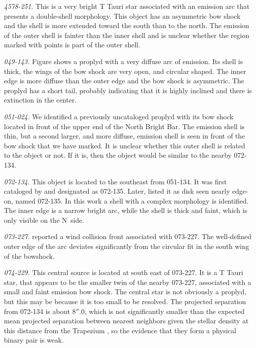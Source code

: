 \documentclass[apj, twocolumn]{aastex63}
\begin{document}
\textit{4578-251.} This is a very bright T Tauri star
associated with an emission arc that presents a double-shell
morphology. This object has an asymmetric bow shock and
the shell is more extended toward the south than to the north.
The emission of the outer shell is fainter than the inner
shell and is unclear whether the region marked with points
is part of the outer shell.

\textit{049-143.} Figure shows a proplyd \citep{Ricci:2008a}
with a very diffuse arc of emission. Its shell is thick,
the wings of the bow shock are very open, and circular
shaped. The inner edge is more diffuse than the outer edge
and the bow shock is asymmetric. The  proplyd has a short
tail, probably indicating that it is highly inclined and
there is extinction in the center. 
 
\textit{051-024.} We identified a previously uncataloged
proplyd with its bow shock located in front of the upper
end of the North Bright Bar. The emission shell is thin,
but a second larger, and more diffuse, emission shell is
seen in front of the bow shock that we have
marked. It is unclear whether this outer shell is related
to the object or not. If it is, then the object would be
similar to the nearby 072-134. 

\textit{072-134.} This object is located to the southeast
from 051-134. It was first cataloged by \citet{ODell:1996a}
and designated as 072-135. Later, \citet{Ricci:2008a} listed
it as disk seen nearly edge-on, named 072-135. In this work
a shell with a complex morphology is identified. The inner
edge is a narrow bright arc, while the shell is thick and
faint, which is only visible on the N~side.                 

\textit{073-227.} \citet{Bally:2000a} reported a wind
collision front associated with 073-227. The well-defined
outer edge of the arc deviates significantly from the
circular fit in the south wing of the bowshock.
   
\textit{074-229.} This central source is located at south
east of 073-227. It is a T Tauri star, that appears to be
the smaller twin of the nearby 073-227, associated with a
small and faint emission bow shock. The central star is
not obviously a proplyd, but this may be because it is too
small to be resolved. The projected separation from 072-134
is about \(8''.0\), which is not significantly smaller than
the expected mean projected separation between nearest
neighbors given the stellar density at this distance from
the Trapezium \citep{Reipurth:2007a}, 
so the evidence that they form a physical binary pair is weak.
\end{document}
